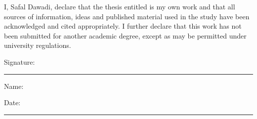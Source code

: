 ﻿
I, Safal Dawadi, declare that the thesis entitled \emph{\PUThesisTitle} is my own work and that all sources of information, ideas and published material used in the study have been acknowledged and cited appropriately. I further declare that this work has not been submitted for another academic degree, except as may be permitted under university regulations.


\vspace{2cm}
\noindent Signature:\ \rule{6cm}{0.4pt}


\vspace{0.7cm}
\noindent Name: \PUStudentName


\vspace{0.7cm}
\noindent Date:\ \rule{5cm}{0.4pt}